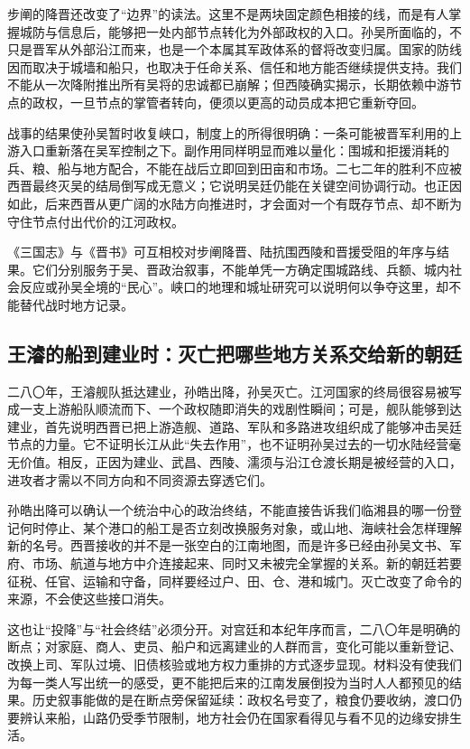 步阐的降晋还改变了“边界”的读法。这里不是两块固定颜色相接的线，而是有人掌握城防与信息后，能够把一处内部节点转化为外部政权的入口。孙吴所面临的，不只是晋军从外部沿江而来，也是一个本属其军政体系的督将改变归属。国家的防线因而取决于城墙和船只，也取决于任命关系、信任和地方能否继续提供支持。我们不能从一次降附推出所有吴将的忠诚都已崩解；但西陵确实揭示，长期依赖中游节点的政权，一旦节点的掌管者转向，便须以更高的动员成本把它重新夺回。

战事的结果使孙吴暂时收复峡口，制度上的所得很明确：一条可能被晋军利用的上游入口重新落在吴军控制之下。副作用同样明显而难以量化：围城和拒援消耗的兵、粮、船与地方配合，不能在战后立即回到田亩和市场。二七二年的胜利不应被西晋最终灭吴的结局倒写成无意义；它说明吴廷仍能在关键空间协调行动。也正因如此，后来西晋从更广阔的水陆方向推进时，才会面对一个有既存节点、却不断为守住节点付出代价的江河政权。

\begin{debate}
《三国志》与《晋书》可互相校对步阐降晋、陆抗围西陵和晋援受阻的年序与结果。它们分别服务于吴、晋政治叙事，不能单凭一方确定围城路线、兵额、城内社会反应或孙吴全境的“民心”。峡口的地理和城址研究可以说明何以争夺这里，却不能替代战时地方记录。
\end{debate}

\subsection{王濬的船到建业时：灭亡把哪些地方关系交给新的朝廷}
二八〇年，王濬舰队抵达建业，孙皓出降，孙吴灭亡。江河国家的终局很容易被写成一支上游船队顺流而下、一个政权随即消失的戏剧性瞬间；可是，舰队能够到达建业，首先说明西晋已把上游造舰、道路、军队和多路进攻组织成了能够冲击吴廷节点的力量。它不证明长江从此“失去作用”，也不证明孙吴过去的一切水陆经营毫无价值。相反，正因为建业、武昌、西陵、濡须与沿江仓渡长期是被经营的入口，进攻者才需以不同方向和不同资源去穿透它们。

孙皓出降可以确认一个统治中心的政治终结，不能直接告诉我们临湘县的哪一份登记何时停止、某个港口的船工是否立刻改换服务对象，或山地、海峡社会怎样理解新的名号。西晋接收的并不是一张空白的江南地图，而是许多已经由孙吴文书、军府、市场、航道与地方中介连接起来、同时又未被完全掌握的关系。新的朝廷若要征税、任官、运输和守备，同样要经过户、田、仓、港和城门。灭亡改变了命令的来源，不会使这些接口消失。

这也让“投降”与“社会终结”必须分开。对宫廷和本纪年序而言，二八〇年是明确的断点；对家庭、商人、吏员、船户和远离建业的人群而言，变化可能以重新登记、改换上司、军队过境、旧债核验或地方权力重排的方式逐步显现。材料没有使我们为每一类人写出统一的感受，更不能把后来的江南发展倒投为当时人人都预见的结果。历史叙事能做的是在断点旁保留延续：政权名号变了，粮食仍要收纳，渡口仍要辨认来船，山路仍受季节限制，地方社会仍在国家看得见与看不见的边缘安排生活。

